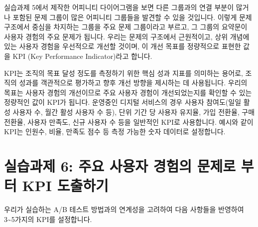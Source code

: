 \documentclass[
  letterpaper,
]{book}
\begin{document}
실습과제 5에서 제작한 어피니티 다이어그램을 보면 다른 그룹과의 연결
부분이 많거나 포함된 문제 그룹이 많은 어피니티 그룹들을 발견할 수 있을
것입니다. 이렇게 문제 구조에서 중심을 차지하는 그룹을 주요 문제
그룹이라고 부르고, 그 그룹의 요약문이 사용자 경험의 주요 문제가 됩니다.
우리는 문제의 구조에서 근원적이고, 상위 개념에 있는 사용자 경험을
우선적으로 개선할 것이며, 이 개선 목표를 정량적으로 표현한 값을 KPI (Key
Performance Indicator)라고 합니다.

KPI는 조직의 목표 달성 정도를 측정하기 위한 핵심 성과 지표를 의미하는
용어로, 조직의 성과를 객관적으로 평가하고 향후 개선 방향을 제시하는 데
사용됩니다. 우리의 목표는 사용자 경험의 개선이므로 주요 사용자 경험이
개선되었는지를 확인할 수 있는 정량적인 값이 KPI가 됩니다. 운영중인
디지털 서비스의 경우 사용자 참여도(일일 활성 사용자 수, 월간 활성 사용자
수 등), 단위 기간 당 사용자 유지율, 가입 전환율, 구매 전환율, 사용자
만족도, 신규 사용자 수 등을 일반적인 KPI로 사용합니다. 예시와 같이 KPI는
인원수, 비율, 만족도 점수 등 측정 가능한 숫자 데이터로 설정합니다.

\section{실습과제 6: 주요 사용자 경험의 문제로 부터 KPI
도출하기}\label{uxc2e4uxc2b5uxacfcuxc81c-6-uxc8fcuxc694-uxc0acuxc6a9uxc790-uxacbduxd5d8uxc758-uxbb38uxc81cuxb85c-uxbd80uxd130-kpi-uxb3c4uxcd9cuxd558uxae30}

우리가 실습하는 A/B 테스트 방법과의 연계성을 고려하여 다음 사항들을
반영하여 3\textasciitilde5가지의 KPI를 설정합니다.
\end{document}
